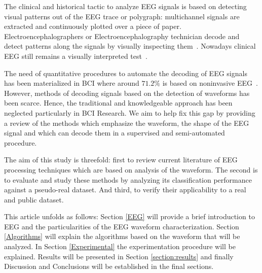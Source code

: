 \documentclass[brainsci,article,submit,moreauthors,pdftex,10pt,a4paper]{mdpi}
\begin{document}
The clinical and historical tactic to analyze EEG signals is based on detecting visual patterns out of the EEG trace or polygraph\citep{Hartman2005}: multichannel signals are extracted and continuously plotted over a piece of paper. Electroencephalographers or Electroencephalography technician decode and detect patterns along the signals by visually inspecting them~\citep{Schomer2010}.   Nowadays clinical EEG still remains a visually interpreted test~\citep{Hartman2005}.


The need of quantitative procedures to automate the decoding of EEG signals has been materialized in BCI where around $71.2\%$ is based on noninvasive EEG~\citep{Guger2017}.  However, methods of decoding signals based on the detection of waveforms has been scarce. Hence, the traditional and knowledgeable approach has been neglected particularly in BCI Research. We aim to help fix this gap by providing a review of the methods which emphasize the waveform, the shape of the EEG signal and which can decode them in a supervised and semi-automated procedure.

The aim of this study is threefold: first to review current literature of EEG processing techniques which are based on analysis of the waveform.  The second is to evaluate and study these methods by analyzing its classification performance against a pseudo-real dataset. And third, to verify their applicability to a real and public dataset.  


This article unfolds as follows: Section \ref{EEG} will provide a brief introduction to EEG and the particularities of the EEG waveform characterization.  Section \ref{Algorithms} will explain the algorithms based on the waveform that will be analyzed.  In Section \ref{Experimental} the experimentation procedure will be explained.  Results will be presented in Section \ref{section:results} and finally Discussion and Conclusions will be established in the final sections.
\end{document}
